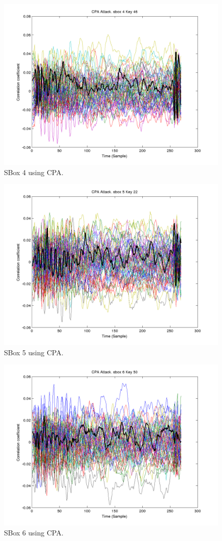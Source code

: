   \begin{figure}[]
  \includegraphics[width=0.9\linewidth]{./cpa4}
  \caption{SBox 4 using CPA.}
  \label{fig:cpa4}
  \end{figure}

  \begin{figure}[]
  \includegraphics[width=0.9\linewidth]{./cpa5}
  \caption{SBox 5 using CPA.}
  \label{fig:cpa5}
  \end{figure}

  \begin{figure}[]
  \includegraphics[width=0.9\linewidth]{./cpa6}
  \caption{SBox 6 using CPA.}
  \label{fig:cpa6}
  \end{figure}

